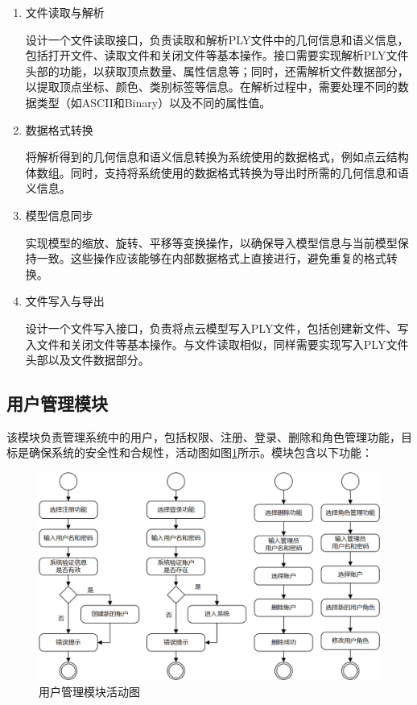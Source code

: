\begin{enumerate}
	\item{文件读取与解析}
	\par 设计一个文件读取接口，负责读取和解析PLY文件中的几何信息和语义信息，包括打开文件、读取文件和关闭文件等基本操作。接口需要实现解析PLY文件头部的功能，以获取顶点数量、属性信息等；同时，还需解析文件数据部分，以提取顶点坐标、颜色、类别标签等信息。在解析过程中，需要处理不同的数据类型（如ASCII和Binary）以及不同的属性值。

	\item{数据格式转换}
	\par 将解析得到的几何信息和语义信息转换为系统使用的数据格式，例如点云结构体数组。同时，支持将系统使用的数据格式转换为导出时所需的几何信息和语义信息。

	\item{模型信息同步}
	\par 实现模型的缩放、旋转、平移等变换操作，以确保导入模型信息与当前模型保持一致。这些操作应该能够在内部数据格式上直接进行，避免重复的格式转换。

	\item{文件写入与导出}
	\par 设计一个文件写入接口，负责将点云模型写入PLY文件，包括创建新文件、写入文件和关闭文件等基本操作。与文件读取相似，同样需要实现写入PLY文件头部以及文件数据部分。
\end{enumerate}

\subsection{用户管理模块}
\par 该模块负责管理系统中的用户，包括权限、注册、登录、删除和角色管理功能，目标是确保系统的安全性和合规性，活动图如图\ref{fig:activity8}所示。模块包含以下功能：

\begin{figure}[htb]
	\centering
	\includegraphics[width=1\textwidth]{figures/uml/activity8.png}
	\caption{用户管理模块活动图}
	\label{fig:activity8}
\end{figure}

